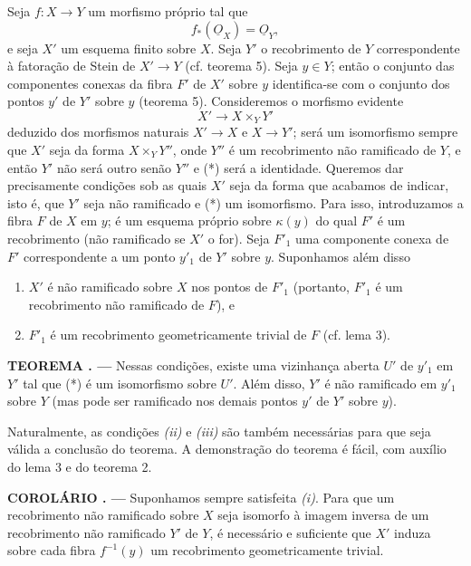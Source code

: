 \documentclass[11pt,twoside,openany]{book}
\numberwithin{equation}{section}
\newcommand{\src}[1]{%
  \phantomsection\hypertarget{src:#1}{}%
  \marginpar{\raggedleft\footnotesize\sffamily #1}%
}
\newcommand{\Osh}{\underline{O}}
\theoremstyle{plain}
\theoremstyle{definition}
\theoremstyle{remark}
\newcommand{\result}[2]{%
  \par\medskip\noindent\textbf{#1%
  \if\relax\detokenize{#2}\relax\else\space#2\fi. ---}\enspace
}
\newcommand{\FgaUnitKey}{frontmatter}
\renewcommand{\src}[1]{%
  \phantomsection\hypertarget{src:\FgaUnitKey:#1}{}%
  \marginpar{\raggedleft\footnotesize\sffamily #1}%
}
\begin{document}
Seja $f:X\longrightarrow Y$ um morfismo próprio tal que
\begin{equation}
  \tag{i}
  f_*(\Osh_X)=\Osh_Y,
\end{equation}
e seja $X'$ um esquema finito sobre $X$. Seja $Y'$ o recobrimento de $Y$
correspondente à fatoração de Stein de $X'\longrightarrow Y$
(cf. teorema 5). Seja $y\in Y$; então o conjunto das componentes conexas
da fibra $F'$ de $X'$ sobre $y$ identifica-se com o conjunto dos pontos
$y'$ de $Y'$ sobre $y$ (teorema 5). Consideremos o morfismo evidente
\begin{equation}
  \tag{*}
  X'\longrightarrow X\times_Y Y'
\end{equation}
deduzido dos morfismos naturais $X'\longrightarrow X$ e
$X\longrightarrow Y'$; será um isomorfismo sempre que $X'$ seja da forma
$X\times_Y Y''$, onde $Y''$ é um recobrimento não ramificado de $Y$, e
então $Y'$ não será outro senão $Y''$ e (*) será a identidade. Queremos dar
precisamente condições sob as quais $X'$ seja da forma que acabamos de
indicar, isto é, que $Y'$ seja não ramificado e (*) um isomorfismo. Para isso,
introduzamos a fibra $F$ de $X$ em $y$; é um esquema próprio sobre
$\kappa(y)$ do qual $F'$ é um recobrimento (não ramificado se $X'$ o for).
Seja $F'_1$ uma componente conexa de $F'$ correspondente a um ponto $y'_1$ de
$Y'$ sobre $y$. Suponhamos além disso
\begin{enumerate}
  \item[\textit{(ii)}] $X'$ é não ramificado sobre $X$ nos pontos de $F'_1$
    (portanto, $F'_1$ é um recobrimento não ramificado de $F$), e
  \item[\textit{(iii)}] $F'_1$ é um recobrimento geometricamente trivial de
    $F$ (cf. lema 3).
\end{enumerate}

\result{TEOREMA}{11} Nessas condições, existe uma vizinhança aberta $U'$ de
$y'_1$ em $Y'$ tal que (*) é um isomorfismo sobre $U'$. Além disso, $Y'$ é não
ramificado em $y'_1$ sobre $Y$ (mas pode ser ramificado nos demais pontos
$y'$ de $Y'$ sobre $y$).

Naturalmente, as condições \textit{(ii)} e \textit{(iii)} são também
necessárias para que seja válida a conclusão do teorema. A demonstração do
teorema é fácil, com auxílio do lema 3 e do teorema 2.

\src{214}
\result{COROLÁRIO}{1} Suponhamos sempre satisfeita \textit{(i)}. Para que um
recobrimento não ramificado sobre $X$ seja isomorfo à imagem inversa de um
recobrimento não ramificado $Y'$ de $Y$, é necessário e suficiente que $X'$
induza sobre cada fibra $f^{-1}(y)$ um recobrimento geometricamente trivial.
\end{document}
